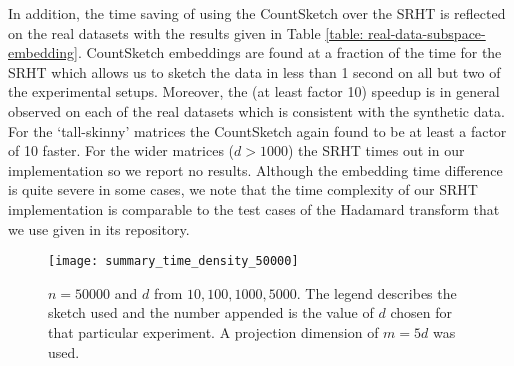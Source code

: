 In addition, the time saving of using the CountSketch over the SRHT is reflected
on the real datasets with the results given in Table
\ref{table: real-data-subspace-embedding}.
CountSketch embeddings are found at a fraction of the time for the SRHT which
allows us to sketch the data in less than 1 second on all but two of the
experimental setups.
Moreover, the (at least factor 10) speedup is in general observed on each of the
real datasets which is consistent with the synthetic data.
For the `tall-skinny' matrices the CountSketch again found to be at least a
factor of 10 faster.
For the wider matrices ($d>1000$) the SRHT times out in our
implementation so we report no results.
Although the embedding time difference is quite severe in some cases, we note
that the time complexity of our SRHT implementation is comparable to the test
cases of the Hadamard transform that we use given in its repository.


\begin{figure}
  \centering
\texttt{[image: summary\_time\_density\_50000]}
        \caption{$n=50000$ and $d$ from $10,100,1000,5000$.  The legend
        describes the sketch used and the number appended is the value of $d$
        chosen for that particular experiment.
        A projection dimension of $m=5d$ was used.}
        \label{fig: summary-time-50000}
\end{figure}










